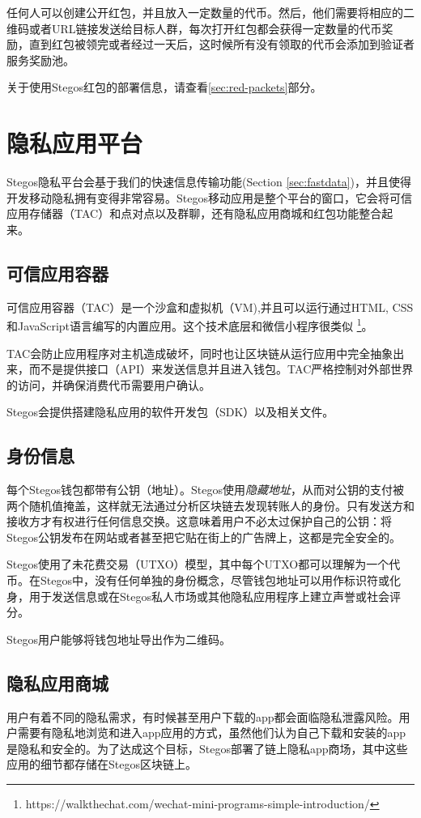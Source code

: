 \documentclass[8pt,fleqn,openany]{book}
\begin{document}
\begin{CJK*}{UTF8}{gbsn}
任何人可以创建公开红包，并且放入一定数量的代币。然后，他们需要将相应的二维码或者URL链接发送给目标人群，每次打开红包都会获得一定数量的代币奖励，直到红包被领完或者经过一天后，这时候所有没有领取的代币会添加到验证者服务奖励池。

关于使用Stegos红包的部署信息，请查看\ref{sec:red-packets}部分。

\chapter{隐私应用平台}\label{chap:privacy-app-platform}
Stegos隐私平台会基于我们的快速信息传输功能(Section \ref{sec:fastdata})，并且使得开发移动隐私拥有变得非常容易。Stegos移动应用是整个平台的窗口，它会将可信应用存储器（TAC）和点对点以及群聊，还有隐私应用商城和红包功能整合起来。

\section{可信应用容器}\label{sec:tac}
可信应用容器（TAC）是一个沙盒和虚拟机（VM),并且可以运行通过HTML, CSS和JavaScript语言编写的内置应用。这个技术底层和微信小程序很类似 \footnote{https://walkthechat.com/wechat-mini-programs-simple-introduction/}。

TAC会防止应用程序对主机造成破坏，同时也让区块链从运行应用中完全抽象出来，而不是提供接口（API）来发送信息并且进入钱包。TAC严格控制对外部世界的访问，并确保消费代币需要用户确认。

Stegos会提供搭建隐私应用的软件开发包（SDK）以及相关文件。

\section{身份信息}\label{sec:identity}
每个Stegos钱包都带有公钥（地址）。Stegos使用\textit{隐藏地址}，从而对公钥的支付被两个随机值掩盖，这样就无法通过分析区块链去发现转账人的身份。只有发送方和接收方才有权进行任何信息交换。这意味着用户不必太过保护自己的公钥：将Stegos公钥发布在网站或者甚至把它贴在街上的广告牌上，这都是完全安全的。

Stegos使用了未花费交易（UTXO）模型，其中每个UTXO都可以理解为一个代币。在Stegos中，没有任何单独的身份概念，尽管钱包地址可以用作标识符或化身，用于发送信息或在Stegos私人市场或其他隐私应用程序上建立声誉或社会评分。

Stegos用户能够将钱包地址导出作为二维码。

\section{隐私应用商城}\label{sec:appstore}
用户有着不同的隐私需求，有时候甚至用户下载的app都会面临隐私泄露风险。用户需要有隐私地浏览和进入app应用的方式，虽然他们认为自己下载和安装的app是隐私和安全的。为了达成这个目标，Stegos部署了链上隐私app商场，其中这些应用的细节都存储在Stegos区块链上。


\end{CJK*}
\end{document}
